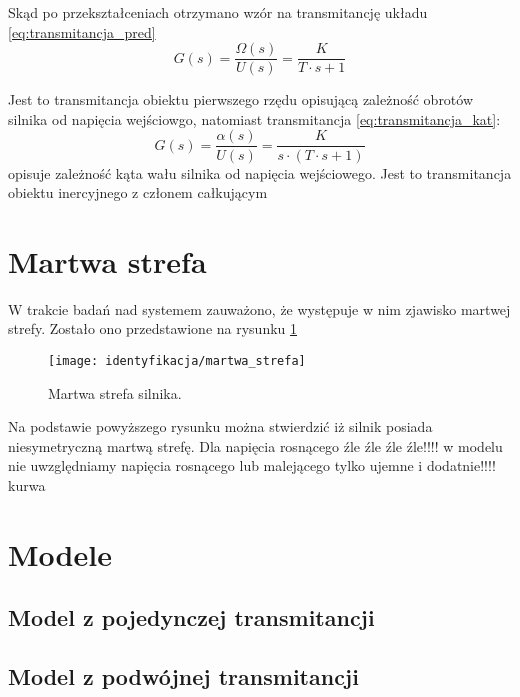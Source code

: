  Skąd po przekształceniach otrzymano wzór na transmitancję układu \ref{eq:transmitancja_pred}
\begin{equation}
\label{eq:transmitancja_pred}
G(s) = \frac{\Omega(s)}{U(s)} = \frac{K}{T \cdot s + 1}
\end{equation}

Jest to transmitancja obiektu pierwszego rzędu opisującą zależność obrotów silnika od napięcia wejściowgo, natomiast transmitancja \ref{eq:transmitancja_kat}:
\begin{equation}
\label{eq:transmitancja_kat}
G(s) = \frac{\alpha(s)}{U(s)} = \frac{ K}{s \cdot (T \cdot s + 1)}
\end{equation}
opisuje zależność kąta wału silnika od napięcia wejściowego. Jest to transmitancja obiektu inercyjnego z członem całkującym

\section{Martwa strefa}
W trakcie badań nad systemem zauważono, że występuje w nim zjawisko martwej strefy. Zostało ono przedstawione na rysunku \ref{fig:martwa_sterfa}
\begin{figure}[H]
	
	\texttt{[image: identyfikacja/martwa\_strefa]}
	\centering
	\caption{Martwa strefa silnika.}
	\label{fig:martwa_sterfa}
\end{figure}

Na podstawie powyższego rysunku można stwierdzić iż silnik posiada niesymetryczną martwą strefę. Dla napięcia rosnącego źle źle źle źle!!!! w modelu nie uwzględniamy napięcia rosnącego lub malejącego tylko ujemne i dodatnie!!!! kurwa
\section{Modele}
\subsection*{Model z pojedynczej transmitancji}
\subsection*{Model z podwójnej transmitancji}
